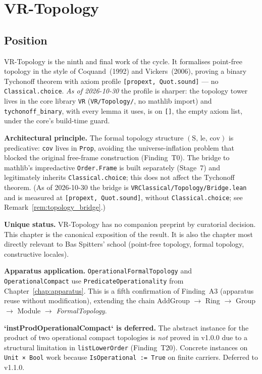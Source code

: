 \chapter{VR-Topology}
\label{chap:topology}

\section{Position}
\label{sec:topology_position}

VR-Topology is the ninth and final work of the cycle.  It formalises
point-free topology in the style of Coquand~(1992) and Vickers~(2006),
proving a binary Tychonoff theorem with axiom profile
\texttt{[propext, Quot.sound]} --- no \texttt{Classical.choice}.
\emph{As of 2026-10-30} the profile is sharper: the topology tower lives in the
core library \texttt{VR} (\texttt{VR/Topology/}, no mathlib import) and
\texttt{tychonoff\_binary}, with every lemma it uses, is on \texttt{[]}, the empty
axiom list, under the core's build-time guard.

\textbf{Architectural principle.} The formal topology structure
$(\text{S},\,\text{le},\,\text{cov})$ is predicative: \texttt{cov}
lives in \texttt{Prop}, avoiding the universe-inflation problem that
blocked the original free-frame construction (Finding~T0).
The bridge to mathlib's impredactive \texttt{Order.Frame} is built
separately (Stage~7) and legitimately inherits \texttt{Classical.choice};
this does not affect the Tychonoff theorem.  (As of 2026-10-30 the bridge is
\texttt{VRClassical/Topology/Bridge.lean} and is measured at
\texttt{[propext, Quot.sound]}, without \texttt{Classical.choice}; see
Remark~\ref{rem:topology_bridge}.)

\textbf{Unique status.} VR-Topology has no companion preprint by
curatorial decision.  This chapter is the canonical exposition of the
result.  It is also the chapter most directly relevant to Bas Spitters'
school (point-free topology, formal topology, constructive locales).

\textbf{Apparatus application.} \texttt{OperationalFormalTopology}
and \texttt{OperationalCompact} use \texttt{PredicateOperationality}
from Chapter~\ref{chap:apparatus}.  This is a fifth confirmation of
Finding~A3 (apparatus reuse without modification), extending the chain
AddGroup $\to$ Ring $\to$ Group $\to$ Module $\to$ \emph{FormalTopology}.

\textbf{`instProdOperationalCompact` is deferred.}  The abstract instance
for the product of two operational compact topologies is \emph{not} proved
in v1.0.0 due to a structural limitation in \texttt{listLowerOrder}
(Finding~T20).  Concrete instances on \texttt{Unit × Bool} work because
\texttt{IsOperational := True} on finite carriers.  Deferred to v1.1.0.

